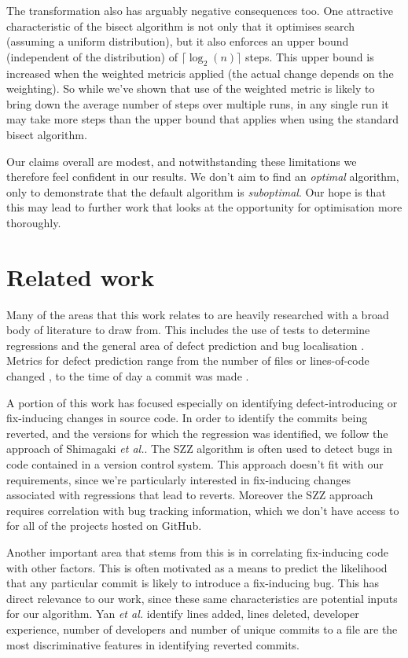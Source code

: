 \documentclass[pdflatex, sn-mathphys, referee]{sn-jnl}%
\theoremstyle{thmstyleone}%
\theoremstyle{thmstyletwo}%
\theoremstyle{thmstylethree}%
\def\etal{{\it et al.}}
\theoremstyle{thmstyleone}
\begin{document}
The transformation also has arguably negative consequences too. One attractive characteristic of the bisect algorithm is not only that it optimises search (assuming a uniform distribution), but it also enforces an upper bound (independent of the distribution) of $\lceil \log_2(n) \rceil$ steps. This upper bound is increased when the weighted metricis applied (the actual change depends on the weighting). So while we've shown that use of the weighted metric is likely to bring down the average number of steps over multiple runs, in any single run it may take more steps than the upper bound that applies when using the standard bisect algorithm.

Our claims overall are modest, and notwithstanding these limitations we therefore feel confident in our results. We don't aim to find an {\it optimal\/} algorithm, only to demonstrate that the default algorithm is {\it suboptimal}. Our hope is that this may lead to further work that looks at the opportunity for optimisation more thoroughly.

\section{Related work}

Many of the areas that this work relates to are heavily researched with a broad body of literature to draw from. This includes the use of tests to determine regressions and the general area of defect prediction and bug localisation \cite{kamei2013, shimagaki2016, yan2019}. Metrics for defect prediction range from the number of files or lines-of-code changed \cite{moser2008}, to the time of day a commit was made \cite{eyolfson2011}.

A portion of this work has focused especially on identifying defect-introducing or fix-inducing changes in source code. In order to identify the commits being reverted, and the versions for which the regression was identified, we follow the approach of Shimagaki \etal \cite{shimagaki2016}. The SZZ algorithm \cite{sliwerski2005} is often used to detect bugs in code contained in a version control system. This approach doesn't fit with our requirements, since we're particularly interested in fix-inducing changes associated with regressions that lead to reverts. Moreover the SZZ approach requires correlation with bug tracking information, which we don't have access to for all of the projects hosted on GitHub.

Another important area that stems from this is in correlating fix-inducing code with other factors. This is often motivated as a means to predict the likelihood that any particular commit is likely to introduce a fix-inducing bug. This has direct relevance to our work, since these same characteristics are potential inputs for our algorithm. Yan \etal \cite{yan2019} identify lines added, lines deleted, developer experience, number of developers and number of unique commits to a file are the most discriminative features in identifying reverted commits.
\end{document}
